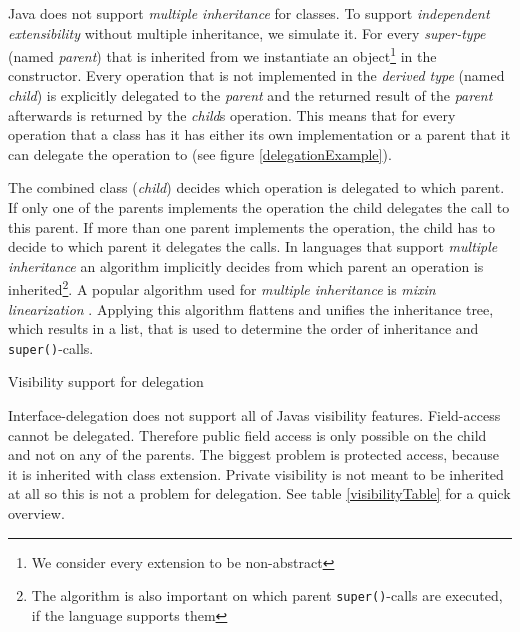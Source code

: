 \documentclass{report}
\begin{document}
Java does not support \emph{multiple inheritance} for classes. To support \emph{independent extensibility} without multiple inheritance, we simulate it. For every \emph{super-type} (named \emph{parent}) that is inherited from we instantiate an object\footnote{We consider every extension to be non-abstract} in the constructor. Every operation that is not implemented in the \emph{derived type} (named \emph{child}) is explicitly delegated to the \emph{parent} and the returned result of the \emph{parent} afterwards is returned by the \emph{child}s operation. This means that for every operation that a class has it has either its own implementation or a parent that it can delegate the operation to (see figure \ref{delegationExample}).

The combined class (\emph{child}) decides which operation is delegated to which parent. If only one of the parents implements the operation the child delegates the call to this parent. If more than one parent implements the operation, the child has to decide to which parent it delegates the calls. In languages that support \emph{multiple inheritance} an algorithm implicitly decides from which parent an operation is inherited\footnote{The algorithm is also important on which parent \lstinline{super()}-calls are executed, if the language supports them}. A popular algorithm used for \emph{multiple inheritance} is \emph{mixin linearization} \cite{Bracha-Mixin-1990}. Applying this algorithm flattens and unifies the inheritance tree, which results in a list, that is used to determine the order of inheritance and \lstinline{super()}-calls.


\begin{table}
\def\arraystretch{1.2}
\setlength\fboxsep{0.6pt}
\centering
{}
\caption{Visibility support for delegation}
\label{visibilityTable}
\end{table}
Interface-delegation does not support all of Javas visibility features. Field-access cannot be delegated. Therefore public field access is only possible on the child and not on any of the parents. The biggest problem is protected access, because it is inherited with class extension. Private visibility is not meant to be inherited at all so this is not a problem for delegation. See table \ref{visibilityTable} for a quick overview.
\end{document}
